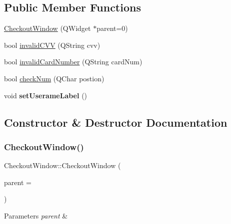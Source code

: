 \subsection*{Public Member Functions}
\begin{DoxyCompactItemize}
\item 
\mbox{\hyperlink{class_checkout_window_aed570d8035e7c0b74108dc5dd5802e57}{Checkout\+Window}} (Q\+Widget $\ast$parent=0)
\item 
bool \mbox{\hyperlink{class_checkout_window_a5fab2958fac97a8a986065cb4ccf8d03}{invalid\+C\+VV}} (Q\+String cvv)
\item 
bool \mbox{\hyperlink{class_checkout_window_a28612fc41a4491136ae4327363cbeb74}{invalid\+Card\+Number}} (Q\+String card\+Num)
\item 
bool \mbox{\hyperlink{class_checkout_window_ad3d3908e0916fbb5abdc134d7d1bcb03}{check\+Num}} (Q\+Char postion)
\item 
\mbox{\label{class_checkout_window_ad1f94db6289c46894f85e5c837922cc4}} 
void {\bfseries set\+Userame\+Label} ()
\end{DoxyCompactItemize}


\subsection{Constructor \& Destructor Documentation}
\mbox{\label{class_checkout_window_aed570d8035e7c0b74108dc5dd5802e57}} 
\subsubsection{\texorpdfstring{Checkout\+Window()}{CheckoutWindow()}}
{\footnotesize\ttfamily Checkout\+Window\+::\+Checkout\+Window (\begin{DoxyParamCaption}\item[{Q\+Widget $\ast$}]{parent = {} }\end{DoxyParamCaption})\hspace{0.3cm}{\ttfamily [explicit]}}


\begin{DoxyParams}{Parameters}
{\em parent} & \\
\hline
\end{DoxyParams}



